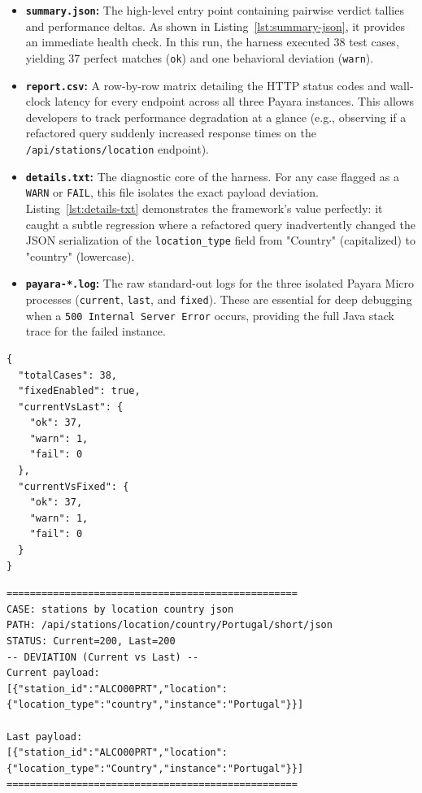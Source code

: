 \begin{itemize}
	\item \textbf{\texttt{summary.json}:} The high-level entry point
		containing pairwise verdict tallies and performance deltas. As shown in Listing~\ref{lst:summary-json},
		it provides an immediate health check. In this run, the harness
		executed 38 test cases, yielding 37 perfect matches (\texttt{ok}) and
		one behavioral deviation (\texttt{warn}).

	\item \textbf{\texttt{report.csv}:} A row-by-row matrix detailing the \ac{HTTP}
		status codes and wall-clock latency for every endpoint across all three Payara
		instances. This allows developers to track performance degradation at a
		glance (e.g., observing if a refactored query suddenly increased response
		times on the \texttt{/api/stations/location} endpoint).

	\item \textbf{\texttt{details.txt}:} The diagnostic core of the harness. For
		any case flagged as a \texttt{WARN} or \texttt{FAIL}, this file
		isolates the exact payload deviation. Listing~\ref{lst:details-txt} demonstrates
		the framework's value perfectly: it caught a subtle regression where a
		refactored query inadvertently changed the \ac{JSON} serialization of the
		\texttt{location\_type} field from "Country" (capitalized) to "country"
		(lowercase).

	\item \textbf{\texttt{payara-*.log}:} The raw standard-out logs for the
		three isolated Payara Micro processes (\texttt{current}, \texttt{last}, and
		\texttt{fixed}). These are essential for deep debugging when a \texttt{500
		Internal Server Error} occurs, providing the full Java stack trace for
		the failed instance.
\end{itemize}

\begin{lstlisting}[caption={Extract of \texttt{summary.json} showing a run with 38 total cases and 1 regression warning.}, label={lst:summary-json}]
{
  "totalCases": 38,
  "fixedEnabled": true,
  "currentVsLast": {
    "ok": 37,
    "warn": 1,
    "fail": 0
  },
  "currentVsFixed": {
    "ok": 37,
    "warn": 1,
    "fail": 0
  }
}
\end{lstlisting}

\vspace*{8\baselineskip}

\begin{lstlisting}[caption={Extract of \texttt{details.txt} showing the exact \ac{JSON} key capitalization deviation caught by the harness.}, label={lst:details-txt}]
==================================================
CASE: stations by location country json
PATH: /api/stations/location/country/Portugal/short/json
STATUS: Current=200, Last=200
-- DEVIATION (Current vs Last) --
Current payload:
[{"station_id":"ALCO00PRT","location":{"location_type":"country","instance":"Portugal"}}]

Last payload:
[{"station_id":"ALCO00PRT","location":{"location_type":"Country","instance":"Portugal"}}]
==================================================
\end{lstlisting}

